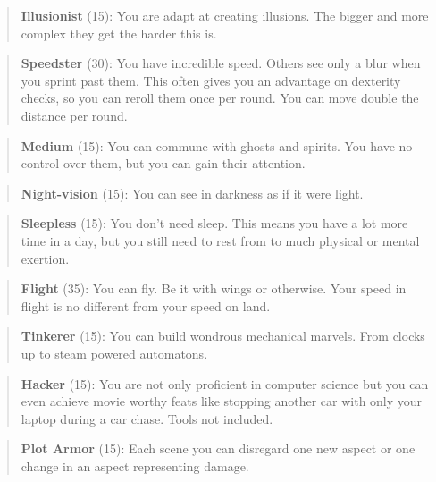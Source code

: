 \documentclass[11pt]{article}
\begin{document}
{\begin{quote}
\textbf{Illusionist} (15): You are adapt at creating illusions. The bigger and more complex they get the harder this is.
\end{quote}

\begin{quote}
\textbf{Speedster} (30): You have incredible speed. Others see only a blur when you sprint past them. This often gives you an advantage on dexterity checks, so you can reroll them once per round. You can move double the distance per round.
\end{quote}

\begin{quote}
\textbf{Medium} (15): You can commune with ghosts and spirits. You have no control over them, but you can gain their attention.
\end{quote}

\begin{quote}
\textbf{Night-vision} (15): You can see in darkness as if it were light.
\end{quote}

\begin{quote}
\textbf{Sleepless} (15): You don't need sleep. This means you have a lot more time in a day, but you still need to rest from to much physical or mental exertion.
\end{quote}

\begin{quote}
\textbf{Flight} (35): You can fly. Be it with wings or otherwise. Your speed in flight is no different from your speed on land.
\end{quote}

\begin{quote}
\textbf{Tinkerer} (15): You can build wondrous mechanical marvels. From clocks up to steam powered automatons. 
\end{quote}

\begin{quote}
\textbf{Hacker} (15): You are not only proficient in computer science but you can even achieve movie worthy feats like stopping another car with only your laptop during a car chase. Tools not included.
\end{quote}

\begin{quote}
\textbf{Plot Armor} (15): Each scene you can disregard one new aspect or one change in an aspect representing damage. 
\end{quote}

}
\end{document}
